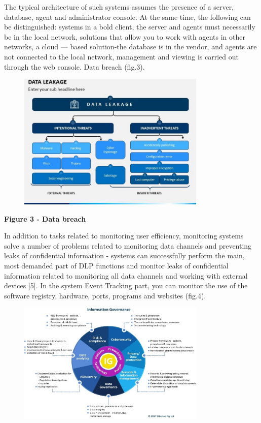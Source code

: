 The typical architecture of such systems assumes the presence of a
server, database, agent and administrator console. At the same time, the
following can be distinguished: systems in a bold client, the server and
agents must necessarily be in the local network, solutions that allow
you to work with agents in other networks, a cloud --- based
solution-the database is in the vendor, and agents are not connected to
the local network, management and viewing is carried out through the web
console. Data breach (fig.3).

\begin{figure}[H]
	\centering
	\includegraphics[width=0.8\textwidth]{assets/65}
	\caption*{}
\end{figure}

\textbf{Figure 3 - Data breach}

In addition to tasks related to monitoring user efficiency, monitoring
systems solve a number of problems related to monitoring data channels
and preventing leaks of confidential information - systems can
successfully perform the main, most demanded part of DLP functions and
monitor leaks of confidential information related to monitoring all data
channels and working with external devices {[}5{]}. In the system Event
Tracking part, you can monitor the use of the software registry,
hardware, ports, programs and websites (fig.4).

\begin{figure}[H]
	\centering
	\includegraphics[width=0.8\textwidth]{assets/66}
	\caption*{}
\end{figure}

